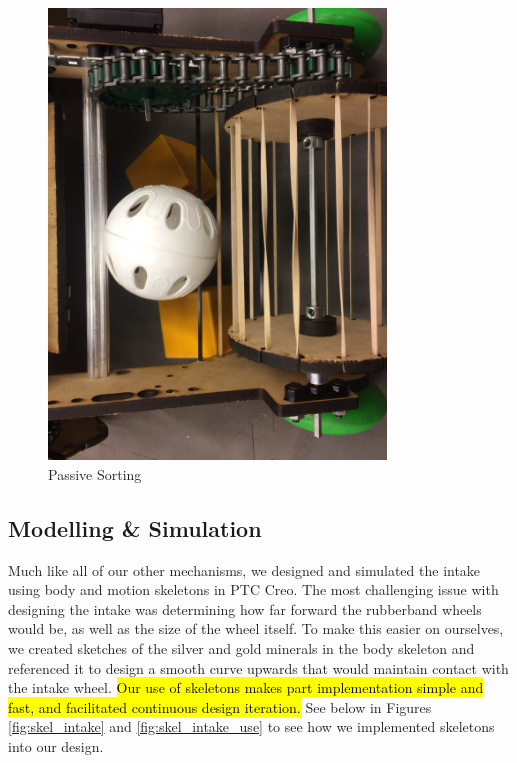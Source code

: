 \begin{figure}[h!]
\centering
\includegraphics[width=0.8\textwidth]{Design_Overview/Sorting.JPG}
\caption{Passive Sorting}
\label{fig:sorting}
\end{figure}

\subsection*{Modelling \& Simulation}
Much like all of our other mechanisms, we designed and simulated the intake using body and motion skeletons in PTC Creo. The most challenging issue with designing the intake was determining how far forward the rubberband wheels would be, as well as the size of the wheel itself. To make this easier on ourselves, we created sketches of the silver and gold minerals in the body skeleton and referenced it to design a smooth curve upwards that would maintain contact with the intake wheel. \hl{Our use of skeletons makes part implementation simple and fast, and facilitated continuous design iteration.} See below in Figures \ref{fig:skel_intake} and \ref{fig:skel_intake_use} to see how we implemented skeletons into our design. 

